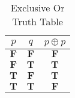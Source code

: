 \begin{table}[htbp]
    \centering
    \begin{tabular}{ccc}
        \toprule
        \(p\)          & \(q\)          & \(p \oplus p\) \\
        \midrule
        \(\mathbf{F}\) & \(\mathbf{F}\) & \(\mathbf{F}\) \\
        \(\mathbf{F}\) & \(\mathbf{T}\) & \(\mathbf{T}\) \\
        \(\mathbf{T}\) & \(\mathbf{F}\) & \(\mathbf{T}\) \\
        \(\mathbf{T}\) & \(\mathbf{T}\) & \(\mathbf{F}\) \\
        \bottomrule
    \end{tabular}
    \caption{Exclusive Or Truth Table}
\end{table}
